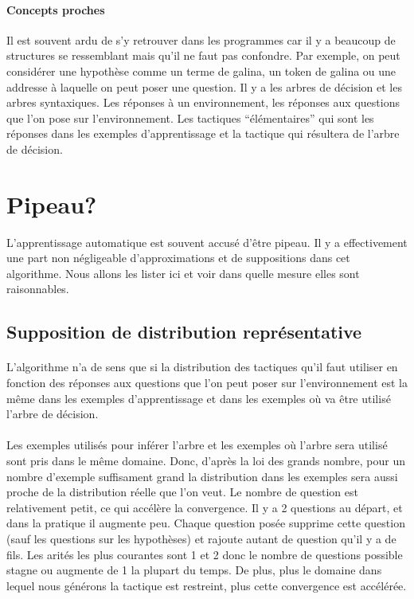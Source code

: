 \paragraph{Concepts proches}Il est souvent ardu de s'y retrouver dans les programmes car il y a beaucoup de structures se ressemblant mais qu'il ne faut pas confondre. Par exemple, on peut considérer une hypothèse comme un terme de galina, un token de galina ou une addresse à laquelle on peut poser une question. Il y a les arbres de décision et les arbres syntaxiques. Les réponses à un environnement, les réponses aux questions que l'on pose sur l'environnement. Les tactiques ``élémentaires'' qui sont les réponses dans les exemples d'apprentissage et la tactique qui résultera de l'arbre de décision.

\section{Pipeau?}
L'apprentissage automatique est souvent accusé d'être pipeau. Il y a effectivement une part non négligeable d'approximations et de suppositions dans cet algorithme. Nous allons les lister ici et voir dans quelle mesure elles sont raisonnables.

\subsection*{Supposition de distribution représentative}

\paragraph{}
L'algorithme n'a de sens que si la distribution des tactiques qu'il faut utiliser en fonction des réponses aux questions que l'on peut poser sur l'environnement est la même dans les exemples d'apprentissage et dans les exemples où va être utilisé l'arbre de décision.

\paragraph{}
Les exemples utilisés pour inférer l'arbre et les exemples où l'arbre sera utilisé sont pris dans le même domaine. Donc, d'après la loi des grands nombre, pour un nombre d'exemple suffisament grand la distribution dans les exemples sera aussi proche de la distribution réelle que l'on veut. Le nombre de question est relativement petit, ce qui accélère la convergence. Il y a 2 questions au départ, et dans la pratique il augmente peu. Chaque question posée supprime cette question (sauf les questions sur les hypothèses) et rajoute autant de question qu'il y a de fils. Les arités les plus courantes sont 1 et 2 donc le nombre de questions possible stagne ou augmente de 1 la plupart du temps. De plus, plus le domaine dans lequel nous générons la tactique est restreint, plus cette convergence est accélérée. 

